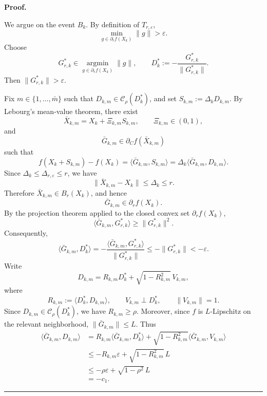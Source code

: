 \documentclass[11pt,a4paper]{article}
\newenvironment{proof}[1][Proof]{%
  \par\noindent\textbf{#1.}\ %
}{%
  \par\vspace{-0.5 ex}            %
  \noindent\hfill\rule{0.5em}{0.5em}\par
  \vspace{1ex}
}
\newcommand{\goldelta}{r}
\begin{document}
\begin{proof}
We argue on the event \(B_k\). By definition of
\(T_{\goldelta,\varepsilon}\),
\[
    \min_{g\in\partial_{\goldelta} f(X_k)}\|g\|>\varepsilon .
\]
Choose
\[
    G_{\goldelta,k}^*
    \in
    \operatorname*{argmin}_{g\in\partial_{\goldelta} f(X_k)}
    \|g\|,
    \qquad
    D_k^*
    :=
    -\frac{G_{\goldelta,k}^*}{\|G_{\goldelta,k}^*\|}.
\]
Then \(\|G_{\goldelta,k}^*\|>\varepsilon\).

Fix \(m\in\{1,\ldots,\bar{m}\}\) such that
\(D_{k,m}\in\mathcal C_\rho(D_k^*)\), and set $ S_{k,m}:=\Delta_kD_{k,m}.$
By Lebourg's mean-value theorem, there exist
\[
    \bar X_{k,m}=X_k+\Xi_{k,m}S_{k,m},
    \qquad
    \Xi_{k,m}\in(0,1),
\]
and
\[
    \bar G_{k,m}\in\partial_C f(\bar X_{k,m})
\]
such that
\[
    f(X_k+S_{k,m})-f(X_k)
    =
    \langle \bar G_{k,m},S_{k,m}\rangle
    =
    \Delta_k\langle \bar G_{k,m},D_{k,m}\rangle .
\]
Since \(\Delta_k\le\Delta_{\goldelta,\varepsilon}\le\goldelta\), we have
\[
    \|\bar X_{k,m}-X_k\|\le\Delta_k\le\goldelta .
\]
Therefore \(\bar X_{k,m}\in B_{\goldelta}(X_k)\), and hence
\[
    \bar G_{k,m}\in\partial_{\goldelta}f(X_k).
\]
By the projection theorem applied to the closed convex set
\(\partial_{\goldelta} f(X_k)\),
\[
    \langle \bar G_{k,m},G_{\goldelta,k}^*\rangle
    \ge
    \|G_{\goldelta,k}^*\|^2 .
\]
Consequently,
\[
    \langle \bar G_{k,m},D_k^*\rangle
    =
    -\frac{
        \langle \bar G_{k,m},G_{\goldelta,k}^*\rangle
    }{
        \|G_{\goldelta,k}^*\|
    }
    \le
    -\|G_{\goldelta,k}^*\|
    <
    -\varepsilon .
\]
Write
\[
    D_{k,m}
    =
    R_{k,m}D_k^*
    +
    \sqrt{1-R_{k,m}^2}\,V_{k,m},
\]
where
\[
    R_{k,m}:=\langle D_k^*,D_{k,m}\rangle,
    \qquad
    V_{k,m}\perp D_k^*,
    \qquad
    \|V_{k,m}\|=1.
\]
Since \(D_{k,m}\in\mathcal C_\rho(D_k^*)\), we have
\(R_{k,m}\ge\rho\). Moreover, since \(f\) is \(L\)-Lipschitz on the relevant
neighborhood, \(\|\bar G_{k,m}\|\le L\). Thus
\[
\begin{aligned}
    \langle \bar G_{k,m},D_{k,m}\rangle
    &=
    R_{k,m}\langle \bar G_{k,m},D_k^*\rangle
    +
    \sqrt{1-R_{k,m}^2}
    \langle \bar G_{k,m},V_{k,m}\rangle                                      \\
    &\le
    -R_{k,m}\varepsilon
    +
    \sqrt{1-R_{k,m}^2}\,L                                                   \\
    &\le
    -\rho\varepsilon+\sqrt{1-\rho^2}\,L                                      \\
    &=
    -c_1 .
\end{aligned}
\]
\end{proof}
\end{document}
